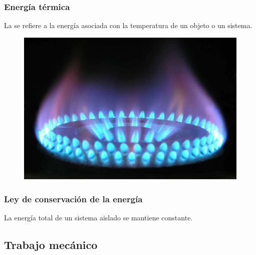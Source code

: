 \documentclass[14pt]{beamer}
\begin{document}
\begin{frame}
\frametitle{Energía térmica}
La  se refiere a la energía asociada con la temperatura de un objeto o un sistema.
\begin{figure}
    \centering
    \includegraphics[scale=0.15]{Imagenes/Energia_termica_01.jpg}
\end{figure}
\end{frame}
\begin{frame}
\frametitle{Ley de conservación de la energía}
La energía total de un sistema aislado se mantiene constante. 
\end{frame}

\subsection{Trabajo mecánico}
\end{document}
